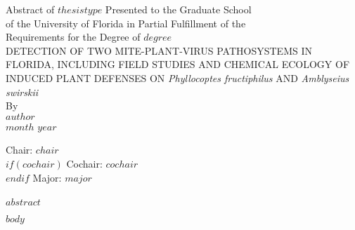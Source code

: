 \documentclass{ufdissertation} %
\begin{document}
\newpage                         %
    \label{abstract}
        \begin{center}\realSingleSpace
            Abstract of $thesistype$ Presented to the Graduate School \\
            of the University of Florida in Partial Fulfillment of the \\
            Requirements for the Degree of $degree$\\[\baselineskip]
            DETECTION OF TWO MITE-PLANT-VIRUS PATHOSYSTEMS IN FLORIDA, INCLUDING FIELD STUDIES AND CHEMICAL ECOLOGY OF INDUCED PLANT DEFENSES ON \textit{Phyllocoptes fructiphilus} AND \textit{Amblyseius swirskii}\\[\baselineskip]
            By\\[\baselineskip]
            $author$ \\[\baselineskip]
            $month$ $year$\\[\baselineskip]
        \end{center}
    \realSingleSpace\vspace*{-\baselineskip}
            \hfill \break
                \noindent Chair: $chair$ \\    %
                $if(cochair)$
                \noindent Cochair: $cochair$ \\%
                $endif$
            \noindent Major: $major$ \\
   \hphantom{forcing a space here} \\
$abstract$

        \setcounter{secnumdepth}{5}
        

\docBodytrue
  \doublespacing
    $body$                       %
\docBodyfalse                    %
\end{document}
